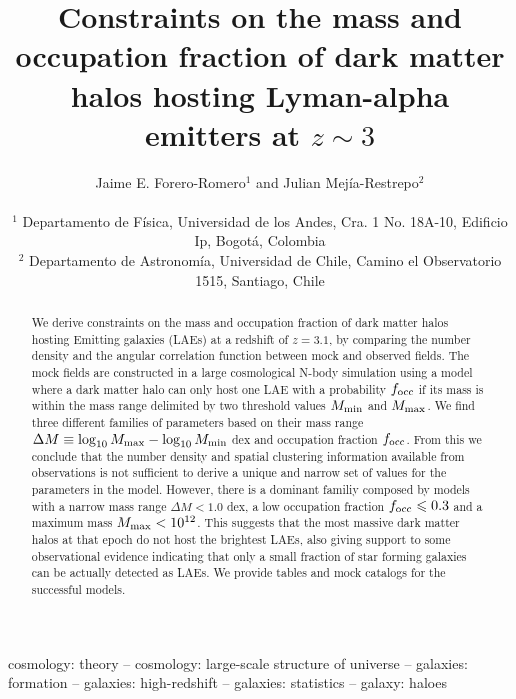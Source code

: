 \documentclass[usenatbib]{mn2e}
\newcommand{\ly}{{\ifmmode{{\rm Ly}\alpha}\else{Ly$\alpha$~}\fi}}
\newcommand{\hMsun}{{\ifmmode{h^{-1}{\rm
        {M_{\odot}}}}\else{$h^{-1}{\rm{M_{\odot}}}$}\fi}}
\begin{document}
\title[Halo mass and occupation fraction for LAEs at
  $z=3.1$]{Constraints on the mass and occupation
  fraction of dark matter halos hosting Lyman-alpha emitters
  at $z\sim 3$}    
\author[~J.~E. Forero-Romero and J. Mejia]{
\parbox[t]{\textwidth}{\raggedright 
Jaime E. Forero-Romero$^{1}$ and
Julian Mej\'ia-Restrepo$^{2}$ 
}
\vspace*{6pt}\\
$^{1}$ Departamento de F\'{i}sica, Universidad de los Andes, Cra. 1
No. 18A-10, Edificio Ip, Bogot\'a, Colombia \\
$^{2}$ Departamento de Astronom\'{i}a, Universidad de Chile, Camino el
Observatorio 1515, Santiago, Chile} 

\maketitle

\begin{abstract}
%
We derive constraints on the mass and occupation fraction of dark
matter halos hosting \ly Emitting galaxies (LAEs) at a redshift of
$z=3.1$, by comparing the number density and the angular
correlation function between mock and observed fields. The mock fields
are constructed in a large cosmological N-body simulation using a
model where a dark matter halo can only host one LAE with a
probability $f_{\rm occ}$ if its mass is within the mass range
delimited by two threshold values  $M_{\rm min}$ and $M_{\rm max}$. We
find three different families of parameters based on their mass range
$\Delta M \equiv \log_{10}M_{\rm max} - \log_{10} M_{\rm min}$ dex and occupation
fraction $f_{\rm occ}$.  From this we  conclude that the number
density and spatial clustering information available from observations
is not sufficient to derive a unique and narrow set of values for the
parameters in the model.  However, there is a dominant familiy composed
by models with a narrow mass range $\Delta M<1.0$ dex, a low
occupation fraction $f_{\rm occ}\leq 0.3$ and a maximum mass $M_{\rm
  max}< 10^{12}$\hMsun.  This suggests that the most massive
dark matter halos at that epoch do not host the brightest LAEs, also
giving support to some observational evidence indicating that only a small
fraction of star forming galaxies can be actually detected as LAEs. We
provide tables and mock catalogs for the successful models.  
\end{abstract}

\begin{keywords}
{cosmology: theory – cosmology: large-scale structure of universe –
  galaxies: formation – galaxies: high-redshift – galaxies: statistics
  – galaxy: haloes} 
\end{keywords}
\end{document}
